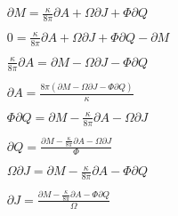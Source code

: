 \begin{equation*}
\displaystyle \begin{array}{lll}\\
 \displaystyle  \partial M = \frac{\kappa}{8 \pi} \partial A + \Omega \partial J + \Phi \partial Q \\\\
 \displaystyle  0 = \frac{\kappa}{8 \pi} \partial A + \Omega \partial J + \Phi \partial Q - \partial M \\\\
 \displaystyle  \frac{\kappa}{8 \pi} \partial A = \partial M - \Omega \partial J - \Phi \partial Q \\\\
 \displaystyle  \partial A = \frac{8 \pi(\partial M - \Omega \partial J - \Phi \partial Q)}{\kappa}\\\\
 \displaystyle  \Phi \partial Q = \partial M - \frac{\kappa}{8 \pi} \partial A - \Omega \partial J \\\\
 \displaystyle  \partial Q = \frac{\partial M - \frac{\kappa}{8 \pi} \partial A - \Omega \partial J}{\Phi} \\\\
 \displaystyle  \Omega \partial J = \partial M - \frac{\kappa}{8 \pi} \partial A - \Phi \partial Q \\\\
 \displaystyle  \partial J = \frac{\partial M - \frac{\kappa}{8 \pi} \partial A - \Phi \partial Q}{\Omega} \\\\
\end{array}
\end{equation*}

